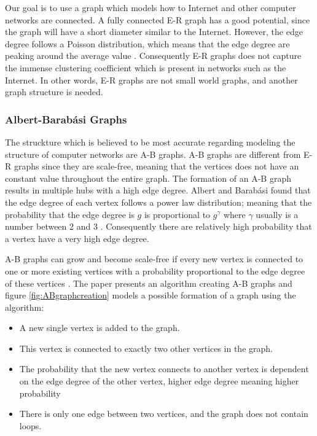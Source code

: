 Our goal is to use a graph which models how to Internet and other computer networks are connected. A fully connected E-R graph has a good potential, since the graph will have a short diameter similar to the Internet. However, the edge degree follows a Poisson distribution, which means that the edge degree are peaking around the average value \cite{audestad}. Consequently E-R graphs does not capture the immense clustering coefficient which is present in networks such as the Internet. In other words, E-R graphs are not small world graphs, and another graph structure is needed.



\subsubsection{\label{ABgraph}Albert-Barabási Graphs}
The struckture which is believed to be most accurate regarding modeling the structure of computer networks are A-B graphs. A-B graphs are different from E-R graphs since they are scale-free, meaning that the vertices does not have an constant value throughout the entire graph. The formation of an A-B graph results in multiple hubs with a high edge degree. Albert and Barabási found that the edge degree of each vertex follows a power law distribution; meaning that the probability that the edge degree is $g$ is proportional to $g^{\gamma}$
where $\gamma$ usually is a number between 2 and 3 \cite{audestad}. Consequently there are relatively high probability that a vertex have a very high edge degree. 

A-B graphs can grow and become scale-free if every new vertex is connected to one or more existing vertices with a probability proportional to the edge degree of these vertices \cite{audestad}. The paper \cite{audestad} presents an algorithm creating  A-B graphs and figure \ref{fig:ABgraphcreation} models a possible formation of a graph using the algorithm:


\begin{itemize}
\item A new single vertex is added to the graph.
\item This vertex is connected to exactly two other vertices in the graph.
\item The probability that the new vertex connects to another vertex is dependent on the edge degree of the other vertex, higher edge degree meaning higher probability
\item There is only one edge between two vertices, and the graph does not contain loops.
\end{itemize}


